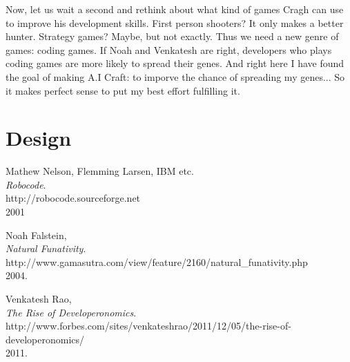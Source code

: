 \documentclass[12pt]{article}
\begin{document}
Now, let us wait a second and rethink about what kind of games Cragh can use to improve his development skills. First person shooters? It only makes a better hunter. Strategy games? Maybe, but not exactly. Thus we need a new genre of games: coding games. If Noah and Venkatesh are right, developers who plays coding games are more likely to spread their genes. And right here I have found the goal of making A.I Craft: to imporve the chance of spreading my genes... So it makes perfect sense to put my best effort fulfilling it.

\section{Design}


\begin{thebibliography}{9}

	Mathew Nelson, Flemming Larsen, IBM etc.\\
	\emph{Robocode}.\\
	http://robocode.sourceforge.net\\
	2001

	Noah Falstein,\\
	\emph{Natural Funativity}.\\
	http://www.gamasutra.com/view/feature/2160/natural\_funativity.php\\
	2004.

	Venkatesh Rao,\\
	\emph{The Rise of Developeronomics}.\\
	http://www.forbes.com/sites/venkateshrao/2011/12/05/the-rise-of-developeronomics/\\
	2011.

\end{thebibliography}

	
\end{document}
